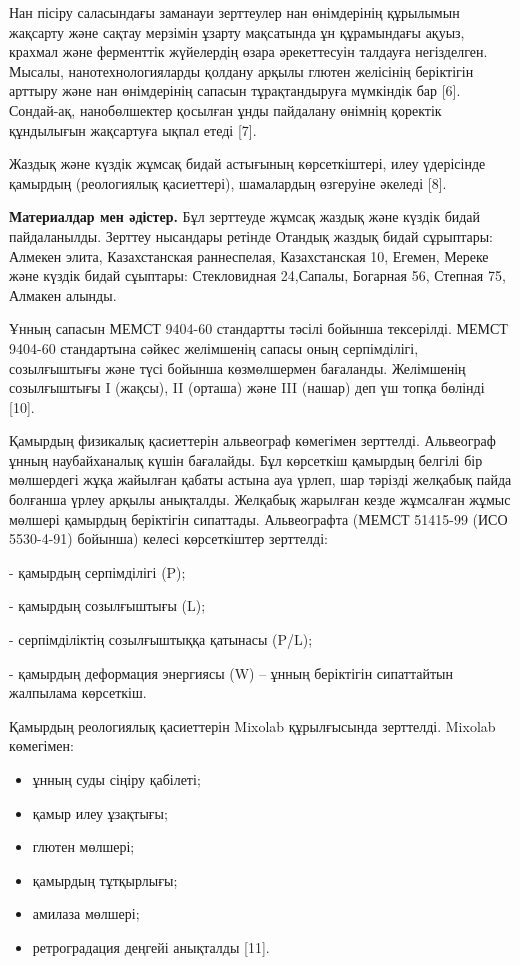 {{Нан пісіру саласындағы заманауи зерттеулер нан өнімдерінің құрылымын
жақсарту және сақтау мерзімін ұзарту мақсатында ұн құрамындағы ақуыз,
крахмал және ферменттік жүйелердің өзара әрекеттесуін талдауға
негізделген. Мысалы, нанотехнологияларды қолдану арқылы глютен желісінің
беріктігін арттыру және нан өнімдерінің сапасын тұрақтандыруға мүмкіндік
бар {[}6{]}. Сондай-ақ, нанобөлшектер қосылған ұнды пайдалану өнімнің
қоректік құндылығын жақсартуға ықпал етеді {[}7{]}.

Жаздық және күздік жұмсақ бидай астығының көрсеткіштері, илеу үдерісінде
қамырдың (реологиялық қасиеттері), шамалардың өзгеруіне әкеледі {[}8{]}.

{\bfseries Материалдар мен әдістер.} Бұл зерттеуде жұмсақ жаздық және
күздік бидай пайдаланылды. Зерттеу нысандары ретінде Отандық жаздық
бидай сұрыптары: Алмекен элита, Казахстанская раннеспелая, Казахстанская
10, Егемен, Мереке және күздік бидай сұыптары: Стекловидная 24,Сапалы,
Богарная 56, Степная 75, Алмакен алынды.

Ұнның сапасын МЕМСТ 9404-60 стандартты тәсілі бойынша тексерілді. МЕМСТ
9404-60 стандартына сәйкес желімшенің сапасы оның серпімділігі,
созылғыштығы және түсі бойынша көзмөлшермен бағаланды. Желімшенің
созылғыштығы I (жақсы), II (орташа) және III (нашар) деп үш топқа
бөлінді {[}10{]}.

Қамырдың физикалық қасиеттерін альвеограф көмегімен зерттелді.
Альвеограф ұнның наубайханалық күшін бағалайды. Бұл көрсеткіш қамырдың
белгілі бір мөлшердегі жұқа жайылған қабаты астына ауа үрлеп, шар
тәрізді желқабық пайда болғанша үрлеу арқылы анықталды. Желқабық
жарылған кезде жұмсалған жұмыс мөлшері қамырдың беріктігін сипаттады.
Альвеографта (МЕМСТ 51415-99 (ИСО 5530-4-91) бойынша) келесі
көрсеткіштер зерттелді:

- қамырдың серпімділігі (P);

- қамырдың созылғыштығы (L);

- серпімділіктің созылғыштыққа қатынасы (P/L);

- қамырдың деформация энергиясы (W) -- ұнның беріктігін сипаттайтын
жалпылама көрсеткіш.

Қамырдың реологиялық қасиеттерін Mixolab құрылғысында зерттелді. Mixolab
көмегімен:

\begin{itemize}
\item
  ұнның суды сіңіру қабілеті;
\item
  қамыр илеу ұзақтығы;
\item
  глютен мөлшері;
\item
  қамырдың тұтқырлығы;
\item
  амилаза мөлшері;
\item
  ретроградация деңгейі анықталды {[}11{]}.
\end{itemize}

}}
